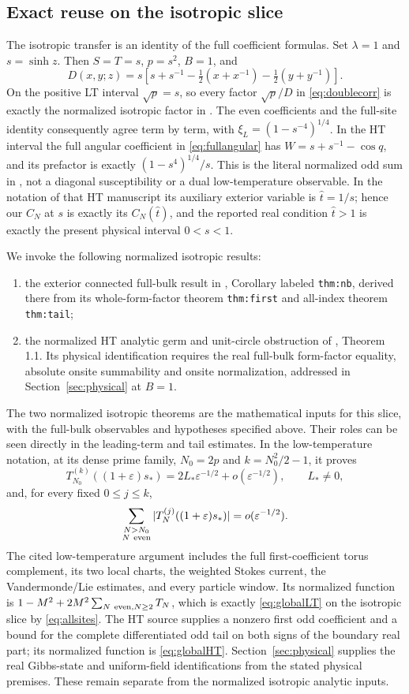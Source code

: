 \documentclass[11pt]{article}
\numberwithin{equation}{section}
\theoremstyle{definition}
\newcommand{\eps}{\varepsilon}
\begin{document}
\subsection{Exact reuse on the isotropic slice}
The isotropic transfer is an identity of the full coefficient formulas. Set
$\lambda=1$ and $s=\sinh z$. Then $S=T=s$, $p=s^2$, $B=1$, and
\[
 D(x,y;z)=s\left[s+s^{-1}
                  -\tfrac12(x+x^{-1})-\tfrac12(y+y^{-1})\right].
\]
On the positive LT interval $\sqrt p=s$, so every factor
$\sqrt p/D$ in \eqref{eq:doublecorr} is exactly the normalized
isotropic factor in \cite{LTsource}. The even coefficients and the
full-site identity consequently agree term by term, with
$\xi_L=(1-s^{-4})^{1/4}$. In the HT interval the full angular coefficient
in \eqref{eq:fullangular} has $W=s+s^{-1}-\cos q$, and its prefactor
is exactly $(1-s^4)^{1/4}/s$. This is the literal normalized odd sum
in \cite{HTsource}, not a diagonal susceptibility or a dual
low-temperature observable.
In the notation of that HT manuscript its auxiliary exterior variable
is $\widehat t=1/s$; hence our $C_N$ at $s$ is exactly its
$C_N(\widehat t)$, and the reported real condition $\widehat t>1$
is exactly the present physical interval $0<s<1$.

We invoke the following normalized isotropic results:
\begin{enumerate}
\item the exterior connected full-bulk result in
\cite{LTsource}, Corollary labeled \texttt{thm:nb}, derived there from
its whole-form-factor theorem \texttt{thm:first} and all-index theorem
\texttt{thm:tail};
\item the normalized HT analytic germ and unit-circle obstruction of
\cite{HTsource}, Theorem 1.1. Its physical identification requires the
real full-bulk form-factor equality, absolute onsite summability and
onsite normalization, addressed in Section~\ref{sec:physical} at $B=1$.
\end{enumerate}
The two normalized isotropic theorems are the mathematical inputs for
this slice, with the full-bulk observables and hypotheses specified
above. Their roles can be seen directly in the leading-term and tail
estimates. In the low-temperature notation, at its dense prime family,
$N_0=2p$ and $k=N_0^2/2-1$, it proves
\[
 T_{N_0}^{(k)}((1+\eps)s_*)
 =2L_*\eps^{-1/2}+o(\eps^{-1/2}),\qquad L_*\ne0,
\]
and, for every fixed $0\le j\le k$,
\[
 \sum_{\substack{N>N_0\\N\ {\rm even}}}
 |T_N^{(j)}((1+\eps)s_*)|=o(\eps^{-1/2}).
\]
The cited low-temperature argument includes the full first-coefficient
torus complement, its two local charts, the weighted Stokes current,
the Vandermonde/Lie estimates, and every particle window.
Its normalized function is
$1-M^2+2M^2\sum_{N\ {\rm even},N\ge2}T_N$, which is exactly
\eqref{eq:globalLT} on the isotropic slice by \eqref{eq:allsites}.
The HT source supplies a nonzero first odd coefficient and a bound
for the complete differentiated odd tail on both signs of the boundary
real part; its normalized function is \eqref{eq:globalHT}.
Section~\ref{sec:physical} supplies the real Gibbs-state and uniform-field
identifications from the stated physical premises. These remain separate
from the normalized isotropic analytic inputs.
\end{document}

